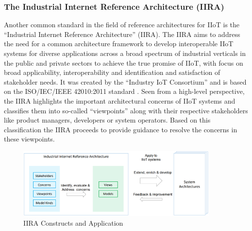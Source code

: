     \subsubsection*{The Industrial Internet Reference Architecture (IIRA)}
    \label{subsubsection:iira}
        Another common standard in the field of reference architectures for IIoT is the ``Industrial Internet Reference Architecture'' (IIRA). The IIRA aims to address the need for a common architecture framework to develop interoperable IIoT systems for diverse applications across a broad spectrum of industrial verticals in the public and private sectors to achieve the true promise of IIoT, with focus on broad applicability, interoperability and identification and satisfaction of stakeholder needs. It was created by the ``Industry IoT Consortium'' and is based on the ISO/IEC/IEEE 42010:2011 standard \cite{iiot_consort_iira}. Seen from a high-level perspective, the IIRA highlights the important architectural concerns of IIoT systems and classifies them into so-called ``viewpoints'' along with their respective stakeholders like product managers, developers or system operators. Based on this classification the IIRA proceeds to provide guidance to resolve the concerns in these viewpoints.

        \begin{figure}[htbp]
            \centering
            \includegraphics[width=0.9\textwidth]{img/iira.png}
            \caption{IIRA Constructs and Application \cite{koschnick_industrie_nodate}}
            \label{figure:iira-process}
        \end{figure}

        \newpage

